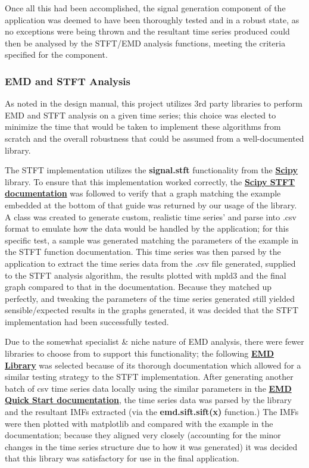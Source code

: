 Once all this had been accomplished, the signal generation component of the application was deemed to have been thoroughly tested and in a robust state, as no exceptions were being thrown and the resultant time series produced could then be analysed by the STFT/EMD analysis functions, meeting the criteria specified for the component. 

\subsubsection{EMD and STFT Analysis}

As noted in the design manual, this project utilizes 3rd party libraries to perform EMD and STFT analysis on a given time series; this choice was elected to minimize the time that would be taken to implement these algorithms from scratch and the overall robustness that could be assumed from a well-documented library.

The STFT implementation utilizes the {\bf signal.stft} functionality from the {\bf\href{https://scipy.org/}{Scipy}} library. To ensure that this implementation worked correctly, the {\bf\href{https://docs.scipy.org/doc/scipy/reference/generated/scipy.signal.stft.html}{Scipy STFT documentation}} was followed to verify that a graph matching the example embedded at the bottom of that guide was returned by our usage of the library. A class was created to generate custom, realistic time series' and parse into .csv format to emulate how the data would be handled by the application; for this specific test, a sample was generated matching the parameters of the example in the STFT function documentation. This time series was then parsed by the application to extract the time series data from the .csv file generated, supplied to the STFT analysis algorithm, the results plotted with mpld3 and the final graph compared to that in the documentation. Because they matched up perfectly, and tweaking the parameters of the time series generated still yielded sensible/expected results in the graphs generated, it was decided that the STFT implementation had been successfully tested. 

Due to the somewhat specialist \& niche nature of EMD analysis, there were fewer libraries to choose from to support this functionality; the following {\bf\href{https://emd.readthedocs.io/en/stable/index.html}{EMD Library}} was selected because of its thorough documentation which allowed for a similar testing strategy to the STFT implementation. After generating another batch of csv time series data locally using the similar parameters in the {\bf\href{https://emd.readthedocs.io/en/stable/emd_tutorials/00_quick_start/emd_tutorial_00_start_01_quicksift.html}{EMD Quick Start documentation}}, the time series data was parsed by the library and the resultant IMFs extracted (via the {\bf emd.sift.sift(x)} function.) The IMFs were then plotted with matplotlib and compared with the example in the documentation; because they aligned very closely (accounting for the minor changes in the time series structure due to how it was generated) it was decided that this library was satisfactory for use in the final application. 

